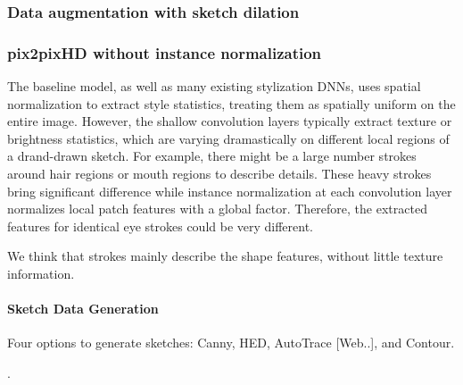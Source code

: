 \subsubsection{Data augmentation with sketch dilation}

\subsubsection{pix2pixHD without instance normalization}
The baseline model, as well as many existing stylization DNNs, uses spatial normalization to extract style statistics, treating them as spatially uniform on the entire image. 
However, the shallow convolution layers typically extract texture or brightness statistics, which are varying dramastically on different local regions of a drand-drawn sketch. For example, there might be a large number strokes around hair regions or mouth regions to describe details. These heavy strokes bring significant difference while instance normalization at each convolution layer normalizes local patch features with a global factor. Therefore, the extracted features for identical eye strokes could be very different. 

We think that strokes mainly describe the shape features, without little texture information. 







\paragraph{Sketch Data Generation}
Four options to generate sketches: Canny, HED, AutoTrace [Web..], and Contour. 

. 